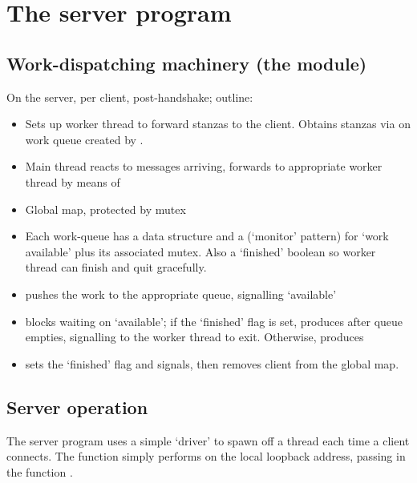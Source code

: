 \section{The server program}
\subsection{Work-dispatching machinery (the  module)}\label{sec:mod-dispatch}
On the server, per client, post-handshake; outline:

\begin{itemize}
  \item Sets up worker thread to forward stanzas to the client. Obtains stanzas via  on work queue created by .

  \item Main thread reacts to messages arriving, forwards to appropriate worker thread by means of 

  \item Global  map, protected by mutex

  \item Each work-queue has a  data structure and a  (`monitor' pattern) for `work available' plus its associated mutex. Also a `finished' boolean so worker thread can finish and quit gracefully.

  \item {} pushes the work to the appropriate queue, signalling `available'

  \item {} blocks waiting on `available'; if the `finished' flag is set, produces  after queue empties, signalling to the worker thread to exit. Otherwise, produces 

  \item {} sets the `finished' flag and signals, then removes client from the global map.
\end{itemize}

\subsection{Server operation}
The server program uses a simple `driver' to spawn off a thread each time a client connects. The function  simply performs  on the local loopback address, passing in the function .

